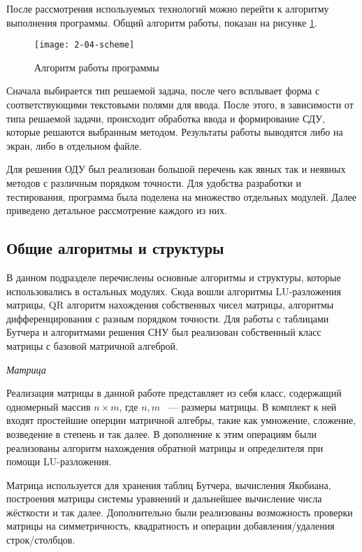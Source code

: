 После рассмотрения используемых технологий можно перейти к алгоритму выполнения программы.
Общий алгоритм работы, показан на рисунке \ref{fig:sheme}.

\begin{figure}
    \texttt{[image: 2-04-scheme]}
    \caption{Алгоритм работы программы}
    \label{fig:sheme}
\end{figure}

Сначала выбирается тип решаемой задача, после чего всплывает форма с соответствующими текстовыми полями для ввода. После этого, в
зависимости от типа решаемой задачи, происходит обработка ввода и формирование СДУ, которые решаются
выбранным методом. Результаты работы выводятся либо на экран, либо в отдельном файле.

Для решения ОДУ был реализован большой перечень как явных так и неявных методов с различным порядком точности. Для удобства разработки
и тестирования, программа была поделена на множество отдельных модулей. Далее приведено детальное рассмотрение каждого из них.

\subsection{Общие алгоритмы и структуры}

В данном подразделе перечислены основные алгоритмы и структуры, которые использовались в остальных модулях. Сюда вошли алгоритмы
LU-разложения матрицы, QR алгоритм нахождения собственных чисел матрицы, алгоритмы дифференцирования с разным порядком точности. Для
работы с таблицами Бутчера и алгоритмами решения СНУ был реализован собственный класс матрицы с базовой матричной алгеброй.

\textit{Матрица}

Реализация матрицы в данной работе представляет из себя класс, содержащий одномерный массив $n \times m$, где $n, m$ ~--- размеры
матрицы. В комплект к ней входят простейшие оперции матричной алгебры, такие как умножение, сложение, возведение в степень и так далее.
В дополнение к этим операциям были реализованы алгоритм нахождения обратной матрицы и определителя при помощи LU-разложения.

Матрица используется для хранения таблиц Бутчера, вычисления Якобиана, построения матрицы системы уравнений и дальнейшее вычисление
числа жёсткости и так далее. Дополнительно были реализованы возможность проверки матрицы на симметричность, квадратность и
операции добавления/удаления строк/столбцов.

